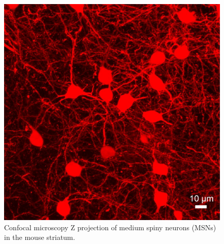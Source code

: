 \documentclass[MSc,english]{Container/thesistemplate}
\begin{document}
\begin{figure}[ht!]
    \centering
    \includegraphics{Images/MediumSpinyNeurons.jpg}
    \caption{Confocal microscopy Z projection of medium spiny neurons (MSNs) in the mouse striatum.}
    \label{fig:msn}
\end{figure}
\end{document}
